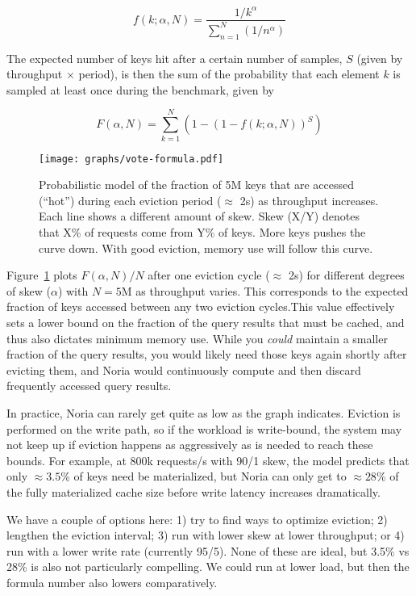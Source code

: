 \begin{displaymath}
  f(k;\alpha,N)={\frac {1/k^{\alpha}}{\sum \limits _{n=1}^{N}(1/n^{\alpha})}}
\end{displaymath}

The expected number of keys hit after a certain number of samples, $S$ (given by
throughput $\times$ period), is then the sum of the probability that each
element $k$ is sampled at least once during the benchmark, given by

\begin{displaymath}
  F(\alpha,N)={\sum \limits _{k=1}^{N} \left(1 - \left(1 - f(k; \alpha, N)\right)^{S}\right)}
\end{displaymath}

\begin{figure}[h]
  \centering
  \texttt{[image: graphs/vote-formula.pdf]}
  \caption{Probabilistic model of the fraction of 5M keys that are accessed
  (``hot'') during each eviction period ($\approx$ 2s) as throughput increases.
  Each line shows a different amount of skew. Skew (X/Y) denotes that X\% of
  requests come from Y\% of keys. More keys pushes the curve down. With good
  eviction, memory use will follow this curve.}
  \label{f:vote-formula}
\end{figure}

Figure~\ref{f:vote-formula} plots $F(\alpha, N)/N$ after one eviction cycle
($\approx$ 2s) for different degrees of skew ($\alpha$) with $N=5\text{M}$ as
throughput varies. This corresponds to the expected fraction of keys accessed
between any two eviction cycles.This value effectively sets a lower bound on
the fraction of the query results that must be cached, and thus also dictates
minimum memory use. While you \emph{could} maintain a smaller fraction of the
query results, you would likely need those keys again shortly after evicting
them, and Noria would continuously compute and then discard frequently accessed
query results.

In practice, Noria can rarely get quite as low as the graph indicates. Eviction
is performed on the write path, so if the workload is write-bound, the system
may not keep up if eviction happens as aggressively as is needed to reach these
bounds. For example, at 800k requests/s with 90/1 skew, the model predicts that
only $\approx3.5$\% of keys need be materialized, but Noria can only get to
$\approx28$\% of the fully materialized cache size before write latency
increases dramatically.

\begin{inprogress}
  We have a couple of options here:
    1) try to find ways to optimize eviction;
    2) lengthen the eviction interval;
    3) run with lower skew at lower throughput; or
    4) run with a lower write rate (currently 95/5).
  None of these are ideal, but 3.5\% vs 28\% is also not particularly
  compelling. We could run at lower load, but then the formula number also
  lowers comparatively.
\end{inprogress}


